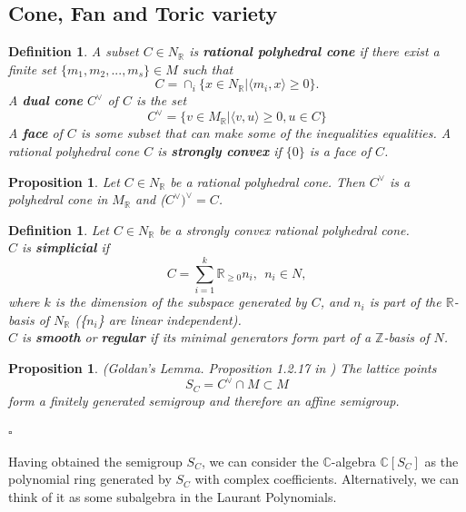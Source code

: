 \documentclass[11pt]{article}
\newtheorem{prop}[thm]{Proposition}
\newtheorem{dfn}[thm]{Definition}
\renewcommand{\qedsymbol}{$\square$}
\begin{document}
\subsection{Cone, Fan and Toric variety}
\begin{dfn}
A subset $C\in N_\mathbb{R}$ is \textbf{rational polyhedral cone} if there exist a finite set $\{m_1, m_2,..., m_s\}\in M$ such that
\begin{equation*}
C=\cap_i \{x\in N_\mathbb{R}| \langle m_i, x\rangle \geq 0\}.
\end{equation*}
A \textbf{dual cone} $C^\vee$ of $C$ is the set
\begin{equation*}
C^{\vee}=\{v\in M_\mathbb{R}|\langle v,u\rangle\geq0, u\in C\}
\end{equation*}
A \textbf{face} of $C$ is some subset that can make some of the inequalities equalities. A rational polyhedral cone $C$ is \textbf{strongly convex} if $\{0\}$ is a face of $C$.
\end{dfn}

\begin{prop}
Let ${C \in N_{\mathbb{R}}}$ be a rational polyhedral cone. Then $C^\vee$ is a polyhedral cone in $M_{\mathbb{R}}$ and ($C^\vee)^\vee=C$. \flushright{\qedsymbol}
\end{prop}

\begin{dfn} 
Let $C\in N_{\mathbb{R}}$ be a strongly convex rational polyhedral cone.\\
$C$ is \textbf{simplicial} if 
$$
C=\sum_{i=1}^{k}\mathbb{R}_{\geq0} n_i, \ \ n_i\in N,
$$
where $k$ is the dimension of the subspace generated by $C$, and ${n_i}$ is part of the $\mathbb{R}$-basis of $N_{\mathbb{R}}$ (\{$n_i$\} are linear independent).\\
$C$ is \textbf{smooth} or \textbf{regular} if its minimal generators form part of a $\mathbb{Z}$-basis of $N$.
\end{dfn}

\begin{prop}(Goldan's Lemma. Proposition 1.2.17 in \cite{cox2009toric})
The lattice points
\begin{equation*}
	S_{C}=C^\vee\cap M\subset M
\end{equation*}
form a finitely generated semigroup and therefore an affine semigroup.\begin{flushright} \qedsymbol\end{flushright}
\end{prop}

Having obtained the semigroup $S_C$, we can consider the $\mathbb{C}$-algebra $\mathbb{C}[S_C]$ as the polynomial ring generated by $S_C$ with complex coefficients. Alternatively, we can think of it as some subalgebra in the Laurant Polynomials.
\end{document}
